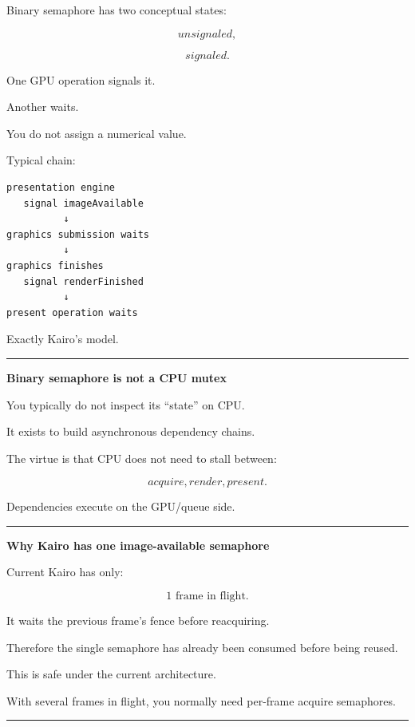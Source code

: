 Binary semaphore has two conceptual states:

\[
unsignaled,
\]

\[
signaled.
\]

One GPU operation signals it.

Another waits.

You do not assign a numerical value.

Typical chain:

\begin{verbatim}
presentation engine
   signal imageAvailable
          ↓
graphics submission waits
          ↓
graphics finishes
   signal renderFinished
          ↓
present operation waits
\end{verbatim}

Exactly Kairo's model.

\begin{center}\rule{0.5\linewidth}{0.5pt}\end{center}

\textbf{Binary semaphore is not a CPU mutex}

You typically do not inspect its ``state'' on CPU.

It exists to build asynchronous dependency chains.

The virtue is that CPU does not need to stall between:

\[
acquire,
render,
present.
\]

Dependencies execute on the GPU/queue side.

\begin{center}\rule{0.5\linewidth}{0.5pt}\end{center}

\textbf{Why Kairo has one image-available semaphore}

Current Kairo has only:

\[
1\text{ frame in flight}.
\]

It waits the previous frame's fence before reacquiring.

Therefore the single  semaphore has already been consumed before being reused.

This is safe under the current architecture.

With several frames in flight, you normally need per-frame acquire semaphores.

\begin{center}\rule{0.5\linewidth}{0.5pt}\end{center}

